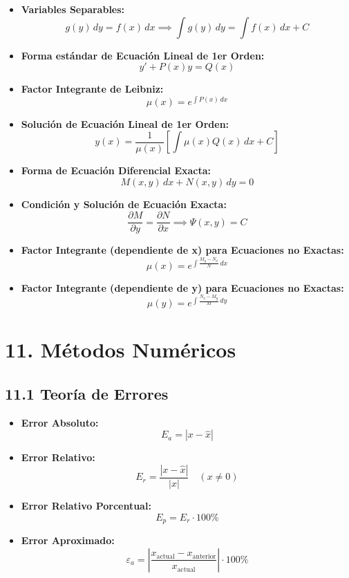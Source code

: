 \documentclass[11pt,a4paper]{article}
\begin{document}
\begin{itemize}
  \item \textbf{Variables Separables:}
  \[
    g(y) \, dy = f(x) \, dx \implies \int g(y) \, dy = \int f(x) \, dx + C
  \]
  \item \textbf{Forma estándar de Ecuación Lineal de 1er Orden:}
  \[
    y' + P(x)y = Q(x)
  \]
  \item \textbf{Factor Integrante de Leibniz:}
  \[
    \mu(x) = e^{\int P(x) \, dx}
  \]
  \item \textbf{Solución de Ecuación Lineal de 1er Orden:}
  \[
    y(x) = \frac{1}{\mu(x)} \left[ \int \mu(x) Q(x) \, dx + C \right]
  \]
  \item \textbf{Forma de Ecuación Diferencial Exacta:}
  \[
    M(x, y) \, dx + N(x, y) \, dy = 0
  \]
  \item \textbf{Condición y Solución de Ecuación Exacta:}
  \[
    \frac{\partial M}{\partial y} = \frac{\partial N}{\partial x} \implies \Psi(x, y) = C
  \]
  \item \textbf{Factor Integrante (dependiente de x) para Ecuaciones no Exactas:}
  \[
    \mu(x) = e^{\int \frac{M_y - N_x}{N} \, dx}
  \]
  \item \textbf{Factor Integrante (dependiente de y) para Ecuaciones no Exactas:}
  \[
    \mu(y) = e^{\int \frac{N_x - M_y}{M} \, dy}
  \]
\end{itemize}

\section*{11. Métodos Numéricos}

\subsection*{11.1 Teoría de Errores}

\begin{itemize}
  \item \textbf{Error Absoluto:}
  \[
    E_a = |x - \hat{x}|
  \]
  \item \textbf{Error Relativo:}
  \[
    E_r = \frac{|x - \hat{x}|}{|x|} \quad (x \ne 0)
  \]
  \item \textbf{Error Relativo Porcentual:}
  \[
    E_p = E_r \cdot 100\%
  \]
  \item \textbf{Error Aproximado:}
  \[
    \varepsilon_a = \left|\frac{x_{\text{actual}} - x_{\text{anterior}}}{x_{\text{actual}}}\right| \cdot 100\%
  \]
\end{itemize}
\end{document}

